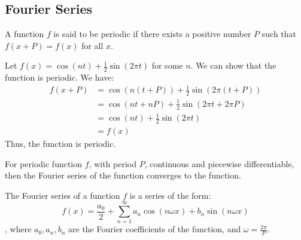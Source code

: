 \documentclass[11pt]{report}
\begin{document}
\subsection{Fourier Series}
\begin{definition}
    A function $f$ is said to be periodic if there exists a positive number $P$ such that $f(x+P) = f(x)$ for all $x$.
\end{definition}
\begin{example}
    Let $f(x) = \cos(nt) + \frac{1}2{\sin(2\pi t)}$ for some $n$. We can show that the function is periodic. We have:
    \begin{align*}
        f(x+P) &= \cos(n(t+P)) + \frac{1}{2}\sin(2\pi(t+P)) \\
        &= \cos(nt + nP) + \frac{1}{2}\sin(2\pi t + 2\pi P) \\
        &= \cos(nt) + \frac{1}{2}\sin(2\pi t) \\
        &= f(x)
    \end{align*}
    Thus, the function is periodic.
\end{example}
\begin{theorem}
    For periodic function $f$, with period $P$, continuous and piecewise differentiable, then the Fourier series of the function converges to the function.
\end{theorem}
\begin{definition}
    The Fourier series of a function $f$ is a series of the form:
    \begin{equation}
        f(x) = \frac{a_0}{2} + \sum_{n=1}^{\infty} a_n \cos(n\omega x) + b_n \sin(n \omega x)
    \end{equation}
    , where $a_0, a_n, b_n$ are the Fourier coefficients of the function, and $\omega = \frac{2\pi}{P}$.
\end{definition}
\end{document}
